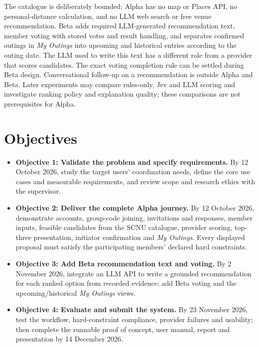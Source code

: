 \documentclass[12pt,a4paper]{article}
\newcommand{\objective}[1]{\textbf{Objective #1}}
\begin{document}
The catalogue is deliberately bounded: Alpha has no map or Places API, no personal-distance calculation, and no LLM web search or free venue recommendation. Beta adds required LLM-generated recommendation text, member voting with stored votes and result handling, and separates confirmed outings in \emph{My Outings} into upcoming and historical entries according to the outing date. The LLM used to write this text has a different role from a provider that scores candidates. The exact voting completion rule can be settled during Beta design. Conversational follow-up on a recommendation is outside Alpha and Beta. Later experiments may compare rules-only, Jev and LLM scoring and investigate ranking policy and explanation quality; these comparisons are not prerequisites for Alpha.

\section*{Objectives}
\begin{itemize}
  \item \objective{1: Validate the problem and specify requirements.} By 12 October 2026, study the target users' coordination needs, define the core use cases and measurable requirements, and review scope and research ethics with the supervisor.
  \item \objective{2: Deliver the complete Alpha journey.} By 12 October 2026, demonstrate accounts, group-code joining, invitations and responses, member inputs, feasible candidates from the SCNU catalogue, provider scoring, top-three presentation, initiator confirmation and \emph{My Outings}. Every displayed proposal must satisfy the participating members' declared hard constraints.
  \item \objective{3: Add Beta recommendation text and voting.} By 2 November 2026, integrate an LLM API to write a grounded recommendation for each ranked option from recorded evidence; add Beta voting and the upcoming/historical \emph{My Outings} views.
  \item \objective{4: Evaluate and submit the system.} By 23 November 2026, test the workflow, hard-constraint compliance, provider failures and usability; then complete the runnable proof of concept, user manual, report and presentation by 14 December 2026.
\end{itemize}
\end{document}
